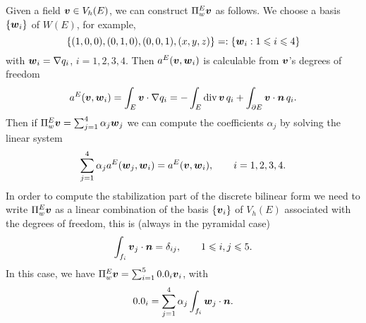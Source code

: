 Given a field $\boldsymbol{v} \in V_h(E)$, we can construct $\Pi_w^E\boldsymbol{v}$
as follows. We choose a basis $\{\boldsymbol{w}_i\}$ of $W(E)$, for
example,
\[
\left\{ (1,0,0), (0,1,0), (0,0,1), (x,y,z) \right\} =: \{
\boldsymbol{w}_i: 1\leqslant i\leqslant 4\}
\]
with $\boldsymbol{w}_i=\nabla q_i$, $i=1,2,3,4$. Then $a^E(\boldsymbol{v},\boldsymbol{w}_i)$ is calculable from $\boldsymbol{v}$'s degrees of freedom
\[
a^E(\boldsymbol{v},\boldsymbol{w}_i) = \int_E\boldsymbol{v}\cdot\nabla q_i =
-\int_E\mbox{div\,}\boldsymbol{v}\,q_i + \int_{\partial E}\boldsymbol{v}\cdot\boldsymbol{n}\,q_i.
\]
Then if $\Pi_w^E\boldsymbol{v}=\sum_{j=1}^4\alpha_j\boldsymbol{w}_j$ we can
compute the coefficients $\alpha_j$ by solving the linear system
\[
\sum_{j=1}^4\alpha_j a^E(\boldsymbol{w}_j,\boldsymbol{w}_i) =
a^E(\boldsymbol{v},\boldsymbol{w}_i), \qquad i=1,2,3,4.
\]
In order to compute the stabilization part of the discrete
bilinear form we need to write $\Pi_w^E\boldsymbol{v}$ as a linear
combination of the basis $\{\boldsymbol{v}_i\}$ of $V_h(E)$ associated with
the degrees of freedom, this is (always in the pyramidal case)
\[
\int_{f_i}\boldsymbol{v}_j\cdot\boldsymbol{n} =\delta_{ij}, \qquad 1\leqslant i,j\leqslant 5.
\]
In this case, we have $\Pi_w^E\bv = \sum_{i=1}^5\beta_i\bv_i$,
with
\[
\beta_i=\sum_{j=1}^4\alpha_j\int_{f_i}\bw_j\cdot\bn.
\]